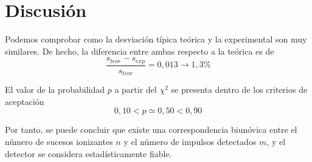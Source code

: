 \documentclass[a4paper,12pt,spanish]{article}
\begin{document}
	
	\section{Discusión}
	
	Podemos comprobar como la desviación típica teórica y la experimental son muy similares. De hecho, la diferencia entre ambas respecto a la teórica es de 
	\[ \frac{s_{teor}- s_{exp} }{ s_{teor} } = 0,013 \longrightarrow 1,3\%
	\]
	
	El valor de la probabilidad $p$ a partir del $\chi ^2$ se presenta dentro de los criterios de aceptación
	\[ 0,10 < p \simeq 0,50 < 0,90
	\]

	Por tanto, se puede concluir que existe una correspondencia biunóvica entre el número de sucesos ionizantes $n$ y el número de impulsos detectados $m$, y 
	el detector se considera estadísticamente fiable.
	
	
	
	

	
	
	
	
\end{document}
